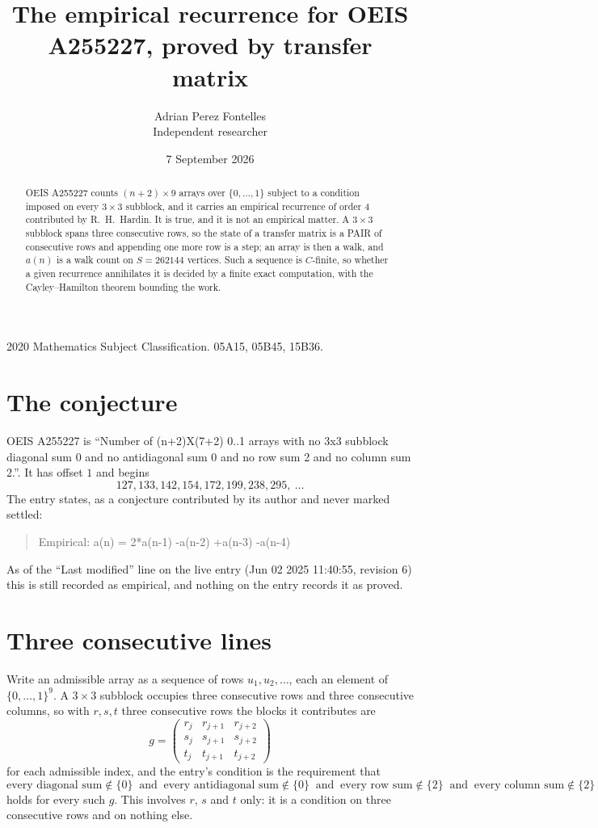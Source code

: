 \documentclass[11pt,a4paper]{article}
\title{The empirical recurrence for OEIS A255227, proved by transfer matrix}
\author{Adrian Perez Fontelles\\ \small Independent researcher}
\date{7 September 2026}
\theoremstyle{plain}
\theoremstyle{definition}
\begin{document}
\maketitle

\begin{abstract}
OEIS A255227 counts $(n+2)\times9$ arrays over $\{0,\dots,1\}$ subject to a condition imposed on
every $3\times3$ subblock, and it carries an empirical recurrence of order $4$
contributed by R.~H.~Hardin. It is true, and it is not an empirical matter. A $3\times3$
subblock spans three consecutive rows, so the state of a transfer matrix is a PAIR of
consecutive rows and appending one more row is a step; an array is then a walk, and
$a(n)$ is a walk count on $S=262144$ vertices. Such a sequence is $C$-finite, so whether a given
recurrence annihilates it is decided by a finite exact computation, with the Cayley--Hamilton
theorem bounding the work.
\end{abstract}

\noindent\small 2020 Mathematics Subject Classification. 05A15, 05B45, 15B36.\normalsize

\section{The conjecture}

OEIS A255227 is ``Number of (n+2)X(7+2) 0..1 arrays with no 3x3 subblock diagonal sum 0 and no antidiagonal sum 0 and no row sum 2 and no column sum 2.''. It has offset $1$ and begins
\[
127, 133, 142, 154, 172, 199, 238, 295,\ \dots
\]
The entry states, as a conjecture contributed by its author and never marked settled:
\begin{quote}
Empirical: a(n) = 2*a(n-1) -a(n-2) +a(n-3) -a(n-4)
\end{quote}
As of the ``Last modified'' line on the live entry (Jun 02 2025 11:40:55, revision 6) this is still
recorded as empirical, and nothing on the entry records it as proved.

\section{Three consecutive lines}

Write an admissible array as a sequence of rows $u_1,u_2,\dots$, each an element of
$\{0,\dots,1\}^{9}$. A $3\times3$ subblock occupies three consecutive rows and
three consecutive columns, so with $r,s,t$ three consecutive rows the blocks it
contributes are
\[
g=\begin{pmatrix}r_j&r_{j+1}&r_{j+2}\\ s_j&s_{j+1}&s_{j+2}\\ t_j&t_{j+1}&t_{j+2}\end{pmatrix}
\]
for each admissible index, and the entry's condition is the requirement that
\[
\text{every diagonal sum} \notin \{0\}\ \text{ and }\ \text{every antidiagonal sum} \notin \{0\}\ \text{ and }\ \text{every row sum} \notin \{2\}\ \text{ and }\ \text{every column sum} \notin \{2\}
\]
holds for every such $g$. This involves $r$, $s$ and $t$ only: it is a condition on
three consecutive rows and on nothing else.
\end{document}
